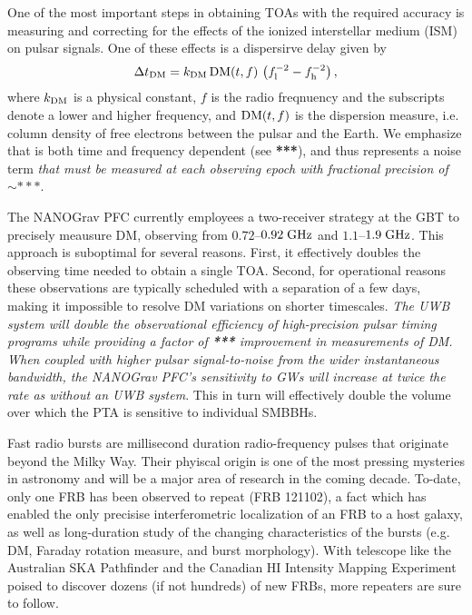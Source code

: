 \documentclass[10pt]{NSF}
\begin{document}
One of the most important steps in obtaining TOAs with the required
accuracy is measuring and correcting for the effects of the ionized
interstellar medium (ISM) on pulsar signals.  One of these effects is
a dispersirve delay given by
\begin{equation}
  \Delta t_{\rm DM} = k_{\rm DM} \, \textrm{DM}(t,f)\, \left( f_{\rm l}^{-2} -
  f_{\rm h}^{-2} \right) ,
\end{equation}
where $k_{\rm DM}$ is a physical constant, $f$ is the radio freqnuency
and the subscripts denote a lower and higher frequency, and $\textrm{DM}(t,f)$
is the dispersion measure, i.e. column density of free electrons
between the pulsar and the Earth.  We emphasize that \DM is both time
and frequency dependent (see \textbf{***}), and thus represents a
noise term \emph{that must be measured at each observing epoch with
  fractional precision of $\sim ***$}.

The NANOGrav PFC currently employees a two-receiver strategy at the
GBT to precisely meausure DM, observing from $0.72$--$0.92\; \textrm{GHz}$ and
$1.1$--$1.9\; \textrm{GHz}$.  This approach is suboptimal for several reasons.
First, it effectively doubles the observing time needed to obtain a
single TOA.  Second, for operational reasons these observations are
typically scheduled with a separation of a few days, making it
impossible to resolve DM variations on shorter timescales.  \emph{The
  UWB system will double the observational efficiency of
  high-precision pulsar timing programs while providing a factor of
  \textbf{***} improvement in measurements of DM.  When coupled with
  higher pulsar signal-to-noise from the wider instantaneous
  bandwidth, the NANOGrav PFC's sensitivity to GWs will increase at
  twice the rate as without an UWB system}.  This in turn will
effectively double the volume over which the PTA is sensitive to
individual SMBBHs.

 Fast radio bursts are millisecond
duration radio-frequency pulses that originate beyond the Milky Way.
Their phyiscal origin is one of the most pressing mysteries in
astronomy and will be a major area of research in the coming decade.
To-date, only one FRB has been observed to repeat (FRB 121102), a fact
which has enabled the only precisise interferometric localization of
an FRB to a host galaxy, as well as long-duration study of the
changing characteristics of the bursts (e.g. DM, Faraday rotation
measure, and burst morphology).  With telescope like the Australian
SKA Pathfinder and the Canadian HI Intensity Mapping Experiment poised
to discover dozens (if not hundreds) of new FRBs, more repeaters are
sure to follow.
\end{document}
